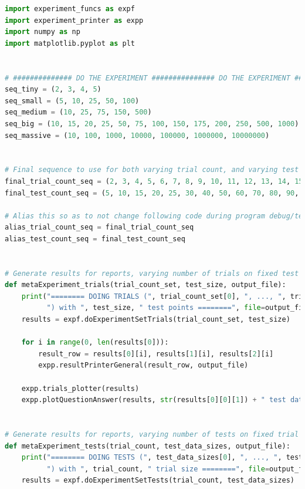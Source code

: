 \documentclass[12pt]{article}
\begin{document}
\begin{lstlisting}[language=Python, caption=new\_meta\_experiment.py, captionpos=t]
import experiment_funcs as expf
import experiment_printer as expp
import numpy as np
import matplotlib.pyplot as plt


# ############## DO THE EXPERIMENT ############### DO THE EXPERIMENT ############### DO THE EXPERIMENT ############## #
seq_tiny = (2, 3, 4, 5)
seq_small = (5, 10, 25, 50, 100)
seq_medium = (10, 25, 75, 150, 500)
seq_big = (10, 15, 20, 25, 50, 75, 100, 150, 175, 200, 250, 500, 1000)
seq_massive = (10, 100, 1000, 10000, 100000, 1000000, 10000000)


# Final sequence to use for both varying trial count, and varying test size
final_trial_count_seq = (2, 3, 4, 5, 6, 7, 8, 9, 10, 11, 12, 13, 14, 15, 20, 25, 30, 35, 40, 45, 50, 55, 60, 65, 70, 75, 80, 85, 90, 95, 100, 125, 150, 175, 200, 225, 250, 300, 350, 400, 450, 500, 1000, 1250, 1500, 1750, 2000, 2500, 10000, 100000)
final_test_count_seq = (5, 10, 15, 20, 25, 30, 40, 50, 60, 70, 80, 90, 100, 110, 120, 130, 140, 150, 175, 200, 225, 250, 275, 300, 325, 350, 500, 750, 1000, 2500, 5000)

# Alias this so as to not change following code during program debug/testing.
alias_trial_count_seq = final_trial_count_seq
alias_test_count_seq = final_test_count_seq


# Generate results for reports, varying number of trials on fixed test size
def metaExperiment_trials(trial_count_set, test_size, output_file):
    print("======== DOING TRIALS (", trial_count_set[0], ", ..., ", trial_count_set[-1],
          ") with ", test_size, " test points ========", file=output_file)
    results = expf.doExperimentSetTrials(trial_count_set, test_size)

    for i in range(0, len(results[0])):
        result_row = results[0][i], results[1][i], results[2][i]
        expp.resultPrinterGeneral(result_row, output_file)

    expp.trials_plotter(results)
    expp.plotQuestionAnswer(results, str(results[0][0][1]) + " test data points")


# Generate results for reports, varying number of tests on fixed trial size
def metaExperiment_tests(trial_count, test_data_sizes, output_file):
    print("======== DOING TESTS (", test_data_sizes[0], ", ..., ", test_data_sizes[-1],
          ") with ", trial_count, " trial size ========", file=output_file)
    results = expf.doExperimentSetTests(trial_count, test_data_sizes)


\end{lstlisting}
\end{document}
